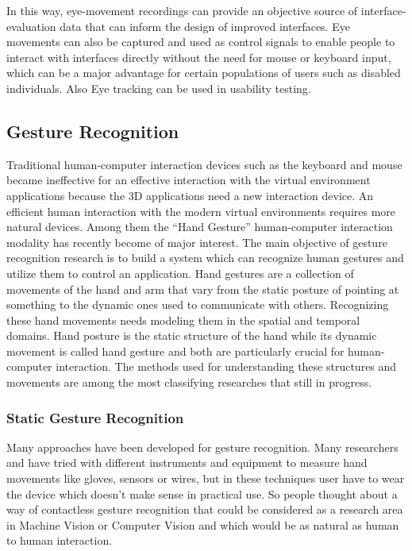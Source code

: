 	In this way, eye-movement recordings can provide an objective source of interface-evaluation data that can inform the design of improved interfaces. Eye movements can also be captured and used as control signals to enable people to interact with interfaces directly without the need for mouse or keyboard input, which can be a major advantage for certain populations of users such as disabled individuals. Also Eye tracking can be used in usability testing.\cite{poole2005eye}

\subsection{Gesture Recognition}
Traditional human-computer interaction devices such as the keyboard and mouse became ineffective for an effective interaction with the virtual environment applications because the 3D applications need a new interaction device. An efficient human interaction with the modern virtual environments requires more natural devices. Among them the “Hand Gesture” human-computer interaction modality has recently become of major interest. The main objective of gesture recognition research is to build a system which can recognize human gestures and utilize them to control an application. Hand gestures are a collection of movements of the hand and arm that vary from the static posture of pointing at something to the dynamic ones used to communicate with others. Recognizing these hand movements needs modeling them in the
spatial and temporal domains. Hand posture is the static structure of the hand while its dynamic movement is called hand gesture and both are particularly crucial for human-computer interaction. The methods used for understanding these structures and movements are among the most classifying researches that still in progress.
\bigskip

\subsubsection{Static Gesture Recognition}

Many approaches have been developed for gesture recognition. Many researchers \cite{yrel7} and \cite{yrel16} have tried with different instruments and equipment to measure hand movements like gloves, sensors or wires, but in these techniques user have to wear the device which doesn’t make sense in practical use. So people thought about a way of contactless gesture recognition that could be considered as a research area in Machine Vision or Computer Vision and which would be as natural as human to human interaction.
\bigskip

